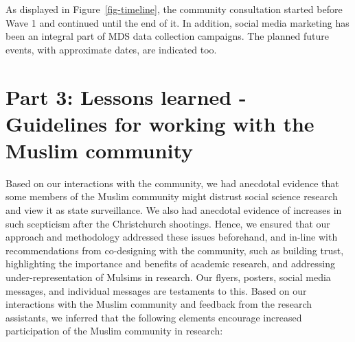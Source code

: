 \documentclass[
]{interact}
\begin{document}
As displayed in Figure~\ref{fig-timeline}, the community consultation
started before Wave 1 and continued until the end of it. In addition,
social media marketing has been an integral part of MDS data collection
campaigns. The planned future events, with approximate dates, are
indicated too.

\section{Part 3: Lessons learned - Guidelines for working with the
Muslim
community}\label{part-3-lessons-learned---guidelines-for-working-with-the-muslim-community}

Based on our interactions with the community, we had anecdotal evidence
that some members of the Muslim community might distrust social science
research and view it as state surveillance. We also had anecdotal
evidence of increases in such scepticism after the Christchurch
shootings. Hence, we ensured that our approach and methodology addressed
these issues beforehand, and in-line with recommendations from
co-designing with the community, such as building trust, highlighting
the importance and benefits of academic research, and addressing
under-representation of Mulsims in research. Our flyers, posters, social
media messages, and individual messages are testaments to this. Based on
our interactions with the Muslim community and feedback from the
research assistants, we inferred that the following elements encourage
increased participation of the Muslim community in research:
\end{document}
